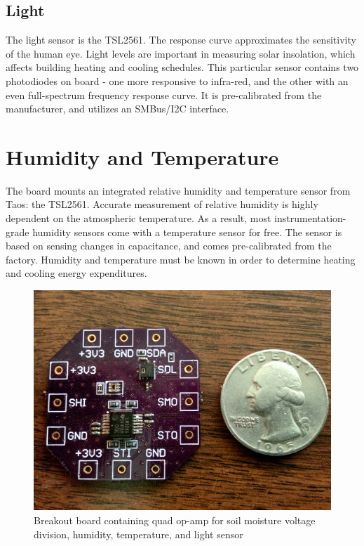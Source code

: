 \begin{table}[h]
\caption{Sensor specifications}
\label{sensor-specs}
\end{table}

\subsection{Light}

The light sensor is the TSL2561. The response curve approximates the sensitivity of the human eye. Light levels are important in measuring solar insolation, which affects building heating and cooling schedules. This particular sensor contains two photodiodes on board - one more responsive to infra-red, and the other with an even full-spectrum frequency response curve. It is pre-calibrated from the manufacturer, and utilizes an SMBus/I2C interface.

\section{Humidity and Temperature}

The board mounts an integrated relative humidity and temperature sensor from Taos: the TSL2561. Accurate measurement of relative humidity is highly dependent on the atmospheric temperature. As a result, most instrumentation-grade humidity sensors come with a temperature sensor for free. The sensor is based on sensing changes in capacitance, and comes pre-calibrated from the factory. Humidity and temperature must be known in order to determine heating and cooling energy expenditures.

\begin{figure}[h]
\centering
\includegraphics[width=0.3\linewidth]{images/sbrk-proto}
\caption[Development breakout]{Breakout board containing quad op-amp for soil moisture voltage division, humidity, temperature, and light sensor}
\label{fig:sbrk-proto}
\end{figure}

